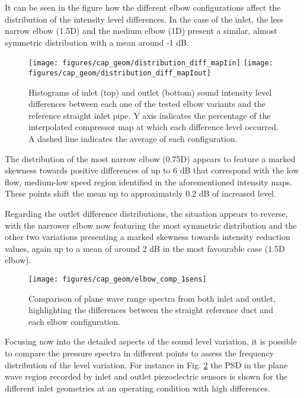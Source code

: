 It can be seen in the figure how the different elbow configurations affect the distribution of the intensity level differences. In the case of the inlet, the less narrow elbow (1.5D) and the medium elbow (1D) present a similar, almost symmetric distribution with a mean around -1 dB.

\begin{figure}[htb!]
\centering
\texttt{[image: figures/cap\_geom/distribution\_diff\_mapIin]}
\texttt{[image: figures/cap\_geom/distribution\_diff\_mapIout]}
\caption{Histograms of inlet (top) and outlet (bottom) sound intensity level differences between each one of the tested elbow variants and the reference straight inlet pipe. Y axis indicates the percentage of the interpolated compressor map at which each difference level occurred. A dashed line indicates the average of each configuration.}
\label{fig:elbow_intens_histog}
\end{figure}

The distribution of the most narrow elbow (0.75D) appears to feature a marked skewness towards positive differences of up to 6 dB that correspond with the low flow, medium-low speed region identified in the aforementioned intensity maps. These points shift the mean up to approximately 0.2 dB of increased level.

Regarding the outlet difference distributions, the situation appears to reverse, with the narrower elbow now featuring the most symmetric distribution and the other two variations presenting a marked skewness towards intensity reduction values, again up to a mean of around 2 dB in the most favourable case (1.5D elbow).

\begin{figure}[htb!]
\centering
\texttt{[image: figures/cap\_geom/elbow\_comp\_1sens]}
\caption{Comparison of plane wave range spectra from both inlet and outlet, highlighting the differences between the straight reference duct and each elbow configuration.}
\label{fig:elbow_comp_1sens}
\end{figure}

Focusing now into the detailed aspects of the sound level variation, it is possible to compare the pressure spectra in different points to assess the frequency distribution of the level variation. For instance in Fig. \ref{fig:elbow_comp_1sens} the PSD in the plane wave region recorded by inlet and outlet piezoelectric sensors is shown for the different inlet geometries at an operating condition with high differences.

